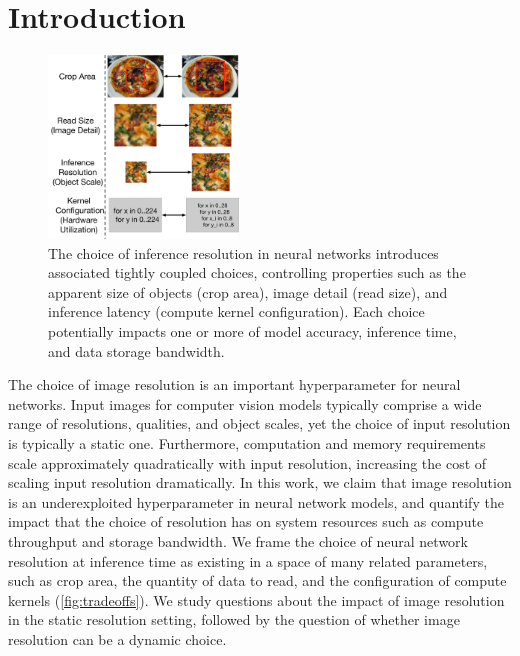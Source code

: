 \section{Introduction}
\begin{figure}
    \centering
    \includegraphics[width=0.45\textwidth]{e2e_diagrams/tradeoff space.pdf}
    \caption{The choice of inference resolution in neural networks introduces associated tightly coupled choices, controlling properties such as the apparent size of objects (crop area), image detail (read size), and inference latency (compute kernel configuration). Each choice potentially impacts one or more of model accuracy, inference time, and data storage bandwidth.}
    \label{fig:tradeoffs}
\end{figure}

The choice of image resolution is an important hyperparameter for neural networks.
Input images for computer vision models typically comprise a wide range of resolutions, qualities, and object scales, yet the choice of input resolution is typically a static one.
Furthermore, computation and memory requirements scale approximately quadratically with input resolution, increasing the cost of scaling input resolution dramatically.
In this work, we claim that image resolution is an underexploited hyperparameter in neural network models, and quantify the impact that the choice of resolution has on system resources such as compute throughput and storage bandwidth.
We frame the choice of neural network resolution at inference time as existing in a space of many related parameters, such as crop area, the quantity of data to read, and the configuration of compute kernels (\autoref{fig:tradeoffs}).
We study questions about the impact of image resolution in the static resolution setting, followed by the question of whether image resolution can be a dynamic choice.
 

